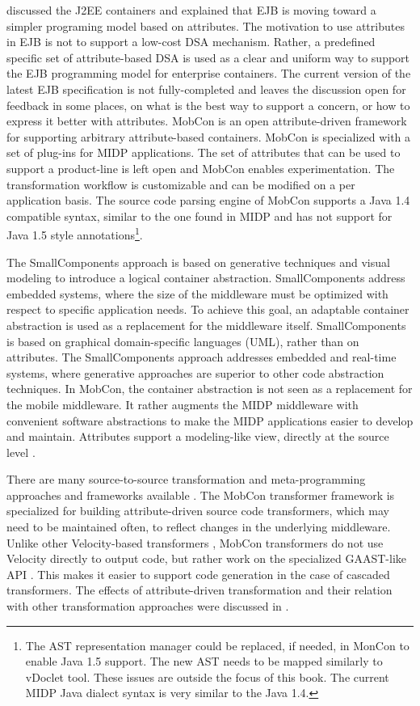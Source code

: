  discussed the J2EE containers and explained that EJB \cite{ejb30} is moving toward a simpler programing model based on attributes. The motivation to use attributes in EJB is not to support a low-cost DSA mechanism. Rather, a predefined specific set of attribute-based DSA is used as a clear and uniform way to support the EJB programming model for enterprise containers. The current version of the latest EJB specification is not fully-completed and leaves the discussion open for feedback in some places, on what is the best way to support a concern, or how to express it better with attributes. MobCon is an open attribute-driven framework for supporting arbitrary attribute-based containers. MobCon is specialized with a set of plug-ins for MIDP applications. The set of attributes that can be used to support a product-line is left open and MobCon enables experimentation. The transformation workflow is customizable and can be modified on a per application basis. The source code parsing engine of MobCon supports a Java 1.4 compatible syntax, similar to the one found in MIDP and has not support for Java 1.5 style annotations\footnote{The AST representation manager could be replaced, if needed, in MonCon to enable Java 1.5 support. The new AST needs to be mapped similarly to vDoclet \cite{vdoclet} tool. These issues are outside the focus of this book. The current MIDP Java dialect syntax is very similar to the Java 1.4.}.

The SmallComponents \cite{www.smallcomps} approach is based on generative techniques and visual modeling to introduce a logical container abstraction. SmallComponents address embedded systems, where the size of the middleware must be optimized with respect to specific application needs. To achieve this goal, an adaptable container abstraction is used as a replacement for the middleware itself. SmallComponents is based on graphical domain-specific languages (UML), rather than on attributes. The SmallComponents approach addresses embedded and real-time systems, where generative approaches are superior to other code abstraction techniques. In MobCon, the container abstraction is not seen as a replacement for the mobile middleware. It rather augments the MIDP middleware with convenient software abstractions to make the MIDP applications easier to develop and maintain. Attributes support a modeling-like view, directly at the source level .

There are many source-to-source transformation and meta-programming approaches and frameworks available \cite{generative.00}. The MobCon transformer framework is specialized for building attribute-driven source code transformers, which may need to be maintained often, to reflect changes in the underlying middleware. Unlike other Velocity-based \cite{velocity} transformers \cite{www.velocity.powered,www.AndroMDA}, MobCon transformers do not use Velocity directly to output code, but rather work on the specialized GAAST-like API . This makes it easier to support code generation in the case of cascaded transformers. The effects of attribute-driven transformation and their relation with other transformation approaches were discussed in .

